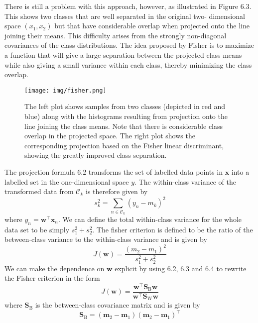 \documentclass[twoside]{article}
\begin{document}
There is still a problem with this approach, however, as illustrated in Figure 6.3. This shows two classes that are well separated in the original two- dimensional space $(x_1, x_2)$ but that have considerable overlap when projected onto the line joining their means. This difficulty arises from the strongly non-diagonal covariances of the class distributions. The idea proposed by Fisher is to maximize a function that will give a large separation between the projected class means while also giving a small variance within each class, thereby minimizing the class overlap.
\newpage
\begin{figure}[h]
    \centering
    \texttt{[image: img/fisher.png]}
    \caption{The left plot shows samples from two classes (depicted in red and blue) along with the histograms resulting from projection onto the line joining the class means. Note that there is considerable class overlap in the projected space. The right plot shows the corresponding projection based on the Fisher linear discriminant, showing the greatly improved class separation.}
\end{figure}
The projection formula 6.2 transforms the set of labelled data points in $\boldsymbol{x}$ into a labelled set in the one-dimensional space $y$. The within-class variance of the transformed data from $\mathcal{C}_k$ is therefore given by
\begin{equation}
    s_k^2 = \sum\limits_{n \in \mathcal{C}_k}(y_n - m_k)^2
\end{equation}
where $y_n = \boldsymbol{w^\intercal x}_n$. We can define the total within-class variance for the whole data set to be simply $s_1^2 + s_2^2$. The fisher criterion is defined to be the ratio of the between-class variance to the within-class variance and is given by
\begin{equation*}
    J(\boldsymbol{w}) = \frac{(m_2 - m_1)^2}{s_1^2 + s_2^2}
\end{equation*}
We can make the dependence on $\boldsymbol{w}$ explicit by using 6.2, 6.3 and 6.4 to rewrite the Fisher criterion in the form
\begin{equation}
    J(\boldsymbol{w}) = \frac{\boldsymbol{w}^\intercal\textbf{S}_\text{B}\boldsymbol{w}}{\boldsymbol{w}^\intercal\textbf{S}_\text{W}\boldsymbol{w}}
\end{equation}
where $\textbf{S}_\text{B}$ is the between-class covariance matrix and is given by
\begin{equation}
    \textbf{S}_\text{B} = (\boldsymbol{m}_2 - \boldsymbol{m}_1)(\boldsymbol{m}_2 - \boldsymbol{m}_1)^\intercal
\end{equation}
\end{document}
